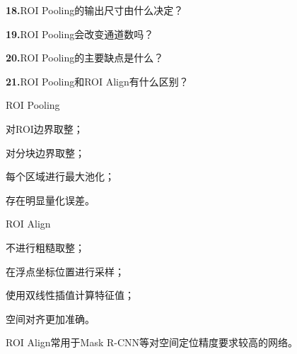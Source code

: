 \documentclass[UTF8,openany,oneside,zihao=-4,fontset=windows]{ctexbook}
\newif\ifshowsolutions
\newcommand{\Question}[2]{%
  \par\Needspace{4\baselineskip}\medskip
  \noindent\textbf{\color{MVBlue}#1}\quad #2\par
}
\newenvironment{AnswerBox}{\begin{tcolorbox}[breakable,colback=MVLight,colframe=MVBlue!45,title={参考答案},fonttitle=\bfseries,boxrule=0.55pt,arc=1.5mm,left=2mm,right=2mm,top=1.5mm,bottom=1.5mm]}{\end{tcolorbox}}
\newcommand{\PracticeSpace}[1]{\ifshowsolutions\else\par\vspace{#1}\par\fi}
\begin{document}
\else
\PracticeSpace{2.4cm}
\fi
\Question{18.}{ROI Pooling的输出尺寸由什么决定？}
\ifshowsolutions
\begin{AnswerBox}
\par ROI Pooling的输出空间尺寸由预先指定的池化目标大小决定，例如：
\par 7×7
\par 而不是由输入ROI本身的大小决定。
\par 如果共享特征图通道数为 C，则无论输入ROI大小如何，输出始终为：
\par C×7×7
\end{AnswerBox}
\else
\PracticeSpace{2.4cm}
\fi
\Question{19.}{ROI Pooling会改变通道数吗？}
\ifshowsolutions
\begin{AnswerBox}
\par 通常不会。
\par ROI Pooling只对每个通道中的空间区域分别进行池化，因此：
\par\noindent\textbullet\quad 输入有 C 个通道；
\par 输出仍有 C 个通道。
\par 它改变的是空间尺寸，而不是通道数。
\end{AnswerBox}
\else
\PracticeSpace{2.4cm}
\fi
\Question{20.}{ROI Pooling的主要缺点是什么？}
\ifshowsolutions
\begin{AnswerBox}
\par\noindent\textbf{ROI Pooling需要对：}
\par\noindent\textbullet\quad ROI边界坐标；
\par 子区域边界坐标
\par 进行取整量化。
\par 这种取整会导致ROI与原始目标之间出现空间偏移，产生量化误差。
\par 对于普通目标检测问题影响可能较小，但对于需要精确像素定位的任务，例如实例分割，影响会更加明显。
\end{AnswerBox}
\else
\PracticeSpace{2.4cm}
\fi
\Question{21.}{ROI Pooling和ROI Align有什么区别？}
\ifshowsolutions
\begin{AnswerBox}
\par ROI Pooling
\par\noindent\textbullet\quad 对ROI边界取整；
\par\noindent\textbullet\quad 对分块边界取整；
\par\noindent\textbullet\quad 每个区域进行最大池化；
\par 存在明显量化误差。
\par ROI Align
\par\noindent\textbullet\quad 不进行粗糙取整；
\par\noindent\textbullet\quad 在浮点坐标位置进行采样；
\par\noindent\textbullet\quad 使用双线性插值计算特征值；
\par 空间对齐更加准确。
\par ROI Align常用于Mask R-CNN等对空间定位精度要求较高的网络。
\end{AnswerBox}
\end{document}
